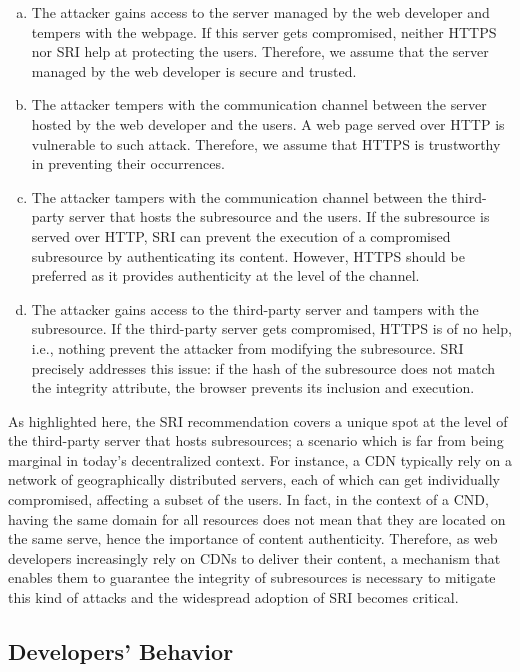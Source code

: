 \documentclass[sigconf,table]{acmart}
\begin{document}
\begin{enumerate}[(a)]
\item 
	The attacker gains access to the server managed by the web developer and tempers with the webpage. 
	If this server gets compromised, neither HTTPS nor SRI help at protecting the users.
	Therefore, we assume that the server managed by the web developer is secure and trusted.
\item 
	The attacker tempers with the communication channel between the server hosted by the web developer and the users.
	A web page served over HTTP is vulnerable to such attack.
	Therefore, we assume that HTTPS is trustworthy in preventing their occurrences.
\item 
	The attacker tampers with the communication channel between the third-party server that hosts the subresource and the users.
	If the subresource is served over HTTP, SRI can prevent the execution of a compromised subresource by authenticating its content.
	However, HTTPS should be preferred as it provides authenticity at the level of the channel.
\item 
	The attacker gains access to the third-party server and tampers with the subresource.
	If the third-party server gets compromised, HTTPS is of no help, i.e., nothing prevent the attacker from modifying the subresource.
	SRI precisely addresses this issue: if the hash of the subresource does not match the integrity attribute, the browser prevents its inclusion and execution.

\end{enumerate}

As highlighted here, the SRI recommendation covers a unique spot at the level of the third-party server that hosts subresources; a scenario which is far from being marginal in today's decentralized context.
For instance, a CDN typically rely on a network of geographically distributed servers, each of which can get individually compromised, affecting a subset of the users.
In fact, in the context of a CND, having the same domain for all resources does not mean that they are located on the same serve, hence the importance of content authenticity.
Therefore, as web developers increasingly rely on CDNs to deliver their content, a mechanism that enables them to guarantee the integrity of subresources is necessary to mitigate this kind of attacks and the widespread adoption of SRI becomes critical. 


\subsection{Developers' Behavior}
\end{document}
